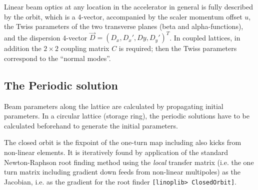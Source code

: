 \documentclass[12pt]{article}
\newcommand\code[1]{{\tt [#1]}}
\begin{document}
Linear beam optics at any location in the accelerator in general is fully described by the orbit, which is a 4-vector, accompanied by the scaler momentum offset $u$, the Twiss parameters of the two transverse planes (beta and alpha-functions), and the dispersion 4-vector $\vec{D}=(D_x,D_x',Dy,D_y')^T$. In coupled lattices, in addition the $2\times 2$ coupling matrix $C$ is required; then the Twiss parameters correspond to the ``normal modes''.


\subsection{The Periodic solution}
Beam parameters along the lattice are calculated by propagating initial parameters.
In a circular lattice (storage ring), the periodic solutions have to be calculated beforehand to generate the initial parameters.

The closed orbit is the fixpoint of the one-turn map including also kicks from non-linear elements. It is iteratively found by application of the standard Newton-Raphson root finding method using the {\em local} transfer matrix (i.e. the one turn matrix including gradient down feeds from non-linear multipoles) as the Jacobian, i.e. as the gradient for the root finder \code{linoplib> ClosedOrbit}.
\end{document}
